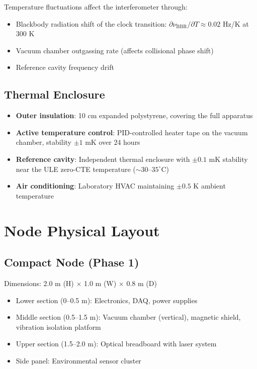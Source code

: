 \documentclass[12pt,a4paper]{article}
\begin{document}
Temperature fluctuations affect the interferometer through:
\begin{itemize}
\item Blackbody radiation shift of the clock transition:
$\partial\nu_{\text{BBR}}/\partial T \approx 0.02$ Hz/K at 300 K
\item Vacuum chamber outgassing rate (affects collisional phase shift)
\item Reference cavity frequency drift
\end{itemize}

\subsection{Thermal Enclosure}

\begin{itemize}
\item \textbf{Outer insulation}: 10 cm expanded polystyrene, covering
the full apparatus
\item \textbf{Active temperature control}: PID-controlled heater tape
on the vacuum chamber, stability $\pm 1$ mK over 24 hours
\item \textbf{Reference cavity}: Independent thermal enclosure with
$\pm 0.1$ mK stability near the ULE zero-CTE temperature ($\sim 30$--$35^\circ$C)
\item \textbf{Air conditioning}: Laboratory HVAC maintaining $\pm 0.5$ K
ambient temperature
\end{itemize}


\section{Node Physical Layout}\label{sec:physical}

\subsection{Compact Node (Phase 1)}

Dimensions: 2.0 m (H) $\times$ 1.0 m (W) $\times$ 0.8 m (D)
\begin{itemize}
\item Lower section (0--0.5 m): Electronics, DAQ, power supplies
\item Middle section (0.5--1.5 m): Vacuum chamber (vertical), magnetic
shield, vibration isolation platform
\item Upper section (1.5--2.0 m): Optical breadboard with laser system
\item Side panel: Environmental sensor cluster
\end{itemize}
\end{document}

